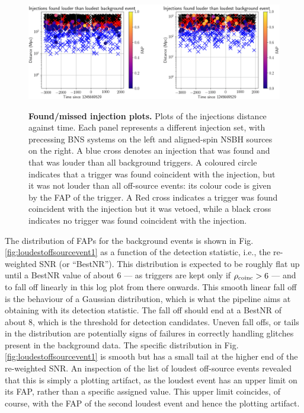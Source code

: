 \documentclass[binding=0.6cm, LaM]{sapthesis}
\begin{document}
        \begin{figure}[!t]
          \noindent
          \label{missinj1}
          \centering
          \includegraphics[width=\textwidth]{missinj1}
          \caption{\textbf{Found/missed injection plots.} Plots of the injections distance against time. Each panel represents a different injection set, with precessing BNS systems on the left and aligned-spin NSBH sources on the right. A blue cross denotes an injection that was found and that was louder than all background triggers. A coloured circle indicates that a trigger was found coincident with the injection, but it was not louder than all off-source events: its colour code is given by the FAP of the trigger.  A Red cross indicates a trigger was found coincident with the injection but it was vetoed, while a black cross indicates no trigger was found coincident with the injection.}
          \label{fig:missinj1}
        \end{figure}

	The distribution of FAPs for the background events is shown in Fig.\,\ref{fig:loudestoffsourcevent1} 
	as a function of the detection statistic, i.e., the re-weighted SNR (or ``BestNR'').
	This distribution is expected to be roughly flat up until a BestNR value of about $6$ 
	--- as triggers are kept only if $\rho_{\rm coinc} > 6$ --- 
	and to fall off linearly in this log plot from there onwards.
	This smooth linear fall off is the behaviour of a Gaussian distribution, 
	which is what the pipeline aims at obtaining with its detection statistic.
	The fall off should end at a BestNR of about $8$, 
	which is the threshold for detection candidates. 
	Uneven fall offs, or tails in the distribution are potentially signs 
	of failures in correctly handling glitches present in the background data. 
	The specific distribution in Fig.\,\ref{fig:loudestoffsourcevent1} is smooth 
	but has a small tail at the higher end of the re-weighted SNR. 
	An inspection of the list of loudest off-source events revealed that 
	this is simply a plotting artifact, as the loudest event has an upper limit on its FAP, 
	rather than a specific assigned value.
	This upper limit coincides, of course, with the FAP of the second loudest event and hence the plotting artifact.
\end{document}
